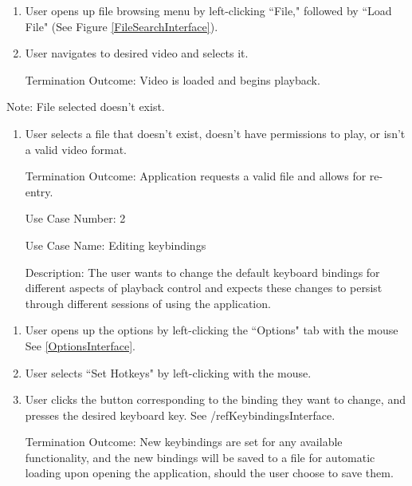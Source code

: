\documentclass[10pt,conference,onecolumn,compsoc]{IEEEtran}
\begin{document}
\begin{enumerate}
\item User opens up file browsing menu by left-clicking ``File," followed by ``Load File" (See Figure \ref{FileSearchInterface}).
\item User navigates to desired video and selects it.
\item[Termination Outcome:] Video is loaded and begins playback.
\end{enumerate}


Note: File selected doesn't exist.
\begin{enumerate}
\item User selects a file that doesn't exist, doesn't have permissions to play, or isn't a valid video format.
\item[Termination Outcome:] Application requests a valid file and allows for re-entry. 

\end{enumerate}
\begin{itemize}
\item[Use Case Number:] 2
\item[Use Case Name:] Editing keybindings
\item[Description:] The user wants to change the default keyboard bindings for different aspects of playback control and expects these changes to persist through different sessions of using the application.
\end{itemize}

\begin{enumerate}
\item User opens up the options by left-clicking the ``Options" tab with the mouse See \ref{OptionsInterface}.
\item User selects ``Set Hotkeys" by left-clicking with the mouse.
\item User clicks the button corresponding to the binding they want to change, and presses the desired keyboard key. See /ref{KeybindingsInterface}.
\item[Termination Outcome:] New keybindings are set for any available functionality, and the new bindings will be saved to a file for automatic loading upon opening the application, should the user choose to save them.
\end{enumerate}
\end{document}
